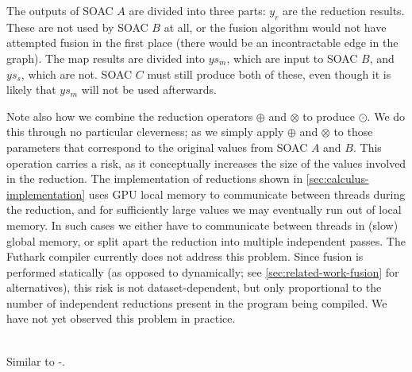 \begin{description}
  The outputs of SOAC $A$ are divided into three parts: $y_{r}$ are
  the reduction results.  These are not used by SOAC $B$ at all, or
  the fusion algorithm would not have attempted fusion in the first
  place (there would be an incontractable edge in the graph).  The map
  results are divided into $ys_{m}$, which are input to SOAC $B$, and
  $ys_{s}$, which are not.  SOAC $C$ must still produce both of these,
  even though it is likely that $ys_{m}$ will not be used afterwards.

  Note also how we combine the reduction operators $\oplus$ and
  $\otimes$ to produce $\odot$.  We do this through no particular
  cleverness; as we simply apply $\oplus$ and $\otimes$ to those
  parameters that correspond to the original values from SOAC $A$ and
  $B$.  This operation carries a risk, as it conceptually increases
  the size of the values involved in the reduction.  The
  implementation of reductions shown in
  \cref{sec:calculus-implementation} uses GPU local memory to
  communicate between threads during the reduction, and for
  sufficiently large values we may eventually run out of local memory.
  In such cases we either have to communicate between threads in
  (slow) global memory, or split apart the reduction into multiple
  independent passes.  The Futhark compiler currently does not address
  this problem.  Since fusion is performed statically (as opposed to
  dynamically; see \cref{sec:related-work-fusion} for alternatives),
  this risk is not dataset-dependent, but only proportional to the
  number of independent reductions present in the program being
  compiled.  We have not yet observed this problem in practice.

\item[\kw{scanomap}-\kw{scanomap}]\hfill\\

  Similar to -.


\end{description}
